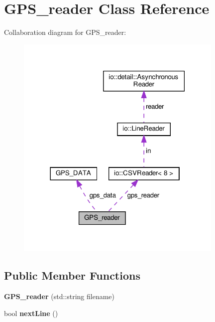 \hypertarget{classGPS__reader}{}\section{G\+P\+S\+\_\+reader Class Reference}
\label{classGPS__reader}


Collaboration diagram for G\+P\+S\+\_\+reader\+:\nopagebreak
\begin{figure}[H]
\begin{center}
\leavevmode
\includegraphics[width=282pt]{classGPS__reader__coll__graph}
\end{center}
\end{figure}
\subsection*{Public Member Functions}
\begin{DoxyCompactItemize}
\item 
\mbox{\label{classGPS__reader_aea612c431bf535d34779946b1eaf17f0}} 
{\bfseries G\+P\+S\+\_\+reader} (std\+::string filename)
\item 
\mbox{\label{classGPS__reader_a3b0ee842ec5fb7d632dbea4e3be04365}} 
bool {\bfseries next\+Line} ()
\end{DoxyCompactItemize}
